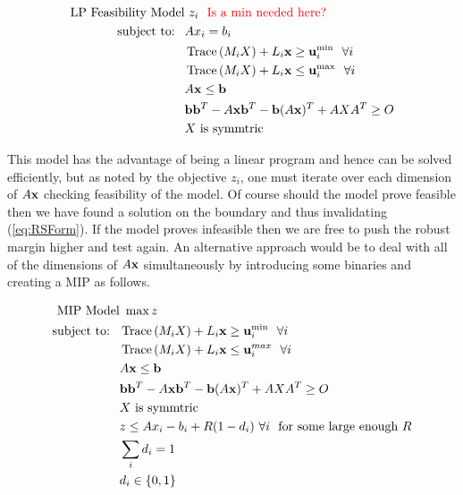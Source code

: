 \clearpage
{}

\begin{subequations}\label{eq:OPTfeasrelaxLP1}
\begin{align}
  \text{LP Feasibility Model}& \ z_i \textcolor{red}{~~\text{Is a min needed here?}}\\
 \text{subject to: } \ &Ax_i= b_i \\
 &\operatorname{Trace}\left(M_iX\right)+ L_i\mathbf{x} \geq \mathbf{u}_i^{\min}  \ \ \forall i\\
 & \operatorname{Trace}\left(M_iX\right)+ L_i\mathbf{x} \leq \mathbf{u}_i^{\max}  \ \ \forall i\\
 	&A\mathbf{x}\leq \mathbf{b} \\
 	&\mathbf{b}\mathbf{b}^T-A\mathbf{x}\mathbf{b}^T-\mathbf{b}(A\mathbf{x})^T+AXA^T\geq O \\
 	&X \text{ is symmtric}
\end{align}
\end{subequations}

This model has the advantage of being a linear program and hence can be solved efficiently, but as noted by the objective $z_i$, one must iterate over each dimension of $A\mathbf{x}$ checking feasibility of the model. 
Of course should the model prove feasible then we have found a solution on the boundary and thus invalidating (\ref{eq:RSForm}). 
If the model proves infeasible then we are free to push the robust margin higher and test again. 
An alternative approach would be to deal with all of the dimensions of $A\mathbf{x}$ simultaneously by introducing some binaries and creating a MIP as follows. 

\begin{subequations}\label{eq:OPTfeasrelaxLP2}
\begin{align}
 \text{MIP Model}& \ \max z  \\
 \text{subject to: } \ &\operatorname{Trace}\left(M_iX\right)+ L_i\mathbf{x} \geq \mathbf{u}_i^{\min}  \ \ \forall i\\
 & \operatorname{Trace}\left(M_iX\right)+ L_i\mathbf{x} \leq \mathbf{u}_i^{max}  \ \ \forall i\\
 	&A\mathbf{x}\leq \mathbf{b} \\
 	&\mathbf{b}\mathbf{b}^T-A\mathbf{x}\mathbf{b}^T-\mathbf{b}(A\mathbf{x})^T+AXA^T\geq O \\
 	&X \text{ is symmtric} \\
 	& z\leq Ax_i-b_i+R(1-d_i) \ \forall i \ \text{ for some large enough $R$} \\
 	& \sum\limits_i d_i=1 \\
 	& d_i\in\{0,1\}
\end{align}
\end{subequations}

